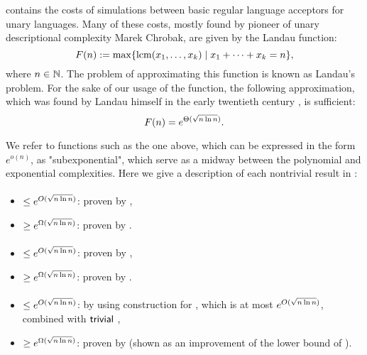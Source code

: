  contains the costs of simulations between basic regular language acceptors for unary languages.
Many of these costs, mostly found by pioneer of unary descriptional complexity Marek Chrobak, are given by the Landau function:
\begin{equation}
	F(n) := \max\{\operatorname{lcm}(x_1,\dots,x_k)\mid x_1+\dots+x_k=n\} \text,
\end{equation}
where $n\in\mathbb N$.
The problem of approximating this function is known as Landau's problem.
For the sake of our usage of the function, the following approximation, which was found by Landau himself in the early twentieth century \cite{Lan03,Lan09}, is sufficient:
\begin{equation}
	F(n) = e^{\Theta(\sqrt{n\ln n})} \text.
\end{equation}

We refer to functions such as the one above, which can be expressed in the form $e^{o(n)}$, as "subexponential", which serve as a midway between the polynomial and exponential complexities.
Here we give a description of each nontrivial result in :

\paragraph{\ONFA{}\tto\ODFA}
\begin{itemize}
	\item $\le e^{O(\sqrt{n\ln n})}$: proven by ,
	\item $\ge e^{\Omega(\sqrt{n\ln n})}$: proven by .
\end{itemize}
\paragraph{\TDFA{}\tto\ODFA}\label{cost:2DFAto1DFAu}
\begin{itemize}
	\item $\le e^{O(\sqrt{n\ln n})}$: proven by ,
	\item $\ge e^{\Omega(\sqrt{n\ln n})}$: proven by .
\end{itemize}
\paragraph{\TDFA{}\tto\ONFA}\label{cost:2DFAto1NFAu}
\begin{itemize}
	\item $\le e^{O(\sqrt{n\ln n})}$: by using construction for \hyperref[cost:2DFAto1DFAu]{\TDFA{}\tto\ODFA}, which is at most $e^{O(\sqrt{n\ln n})}$, combined with $\mathsf{trivial}$ \ODFA{}\tto\ONFA,
	\item $\ge e^{\Omega(\sqrt{n\ln n})}$: proven by  (shown as an improvement of the lower bound of \hyperref[cost:2DFAto1DFAu]{\TDFA{}\tto\ODFA}).
\end{itemize}
